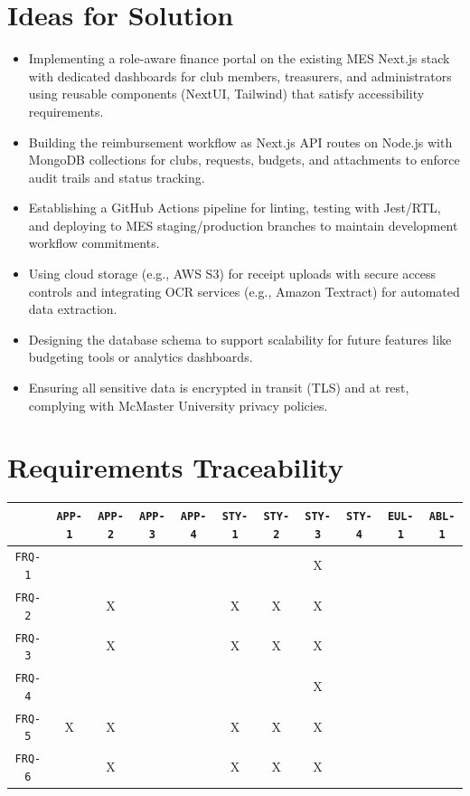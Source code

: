 \documentclass[12pt]{article}
\begin{document}
\section{Ideas for Solution}
  \begin{itemize}
    \item Implementing a role-aware finance portal on the existing MES Next.js stack with dedicated dashboards for club members, treasurers, and administrators using reusable components (NextUI, Tailwind) that satisfy accessibility requirements.
    \item Building the reimbursement workflow as Next.js API routes on Node.js with MongoDB collections for clubs, requests, budgets, and attachments to enforce audit trails and status tracking.
    \item Establishing a GitHub Actions pipeline for linting, testing with Jest/RTL, and deploying to MES staging/production branches to maintain development workflow commitments.
    \item Using cloud storage (e.g., AWS S3) for receipt uploads with secure access controls and integrating OCR services (e.g., Amazon Textract) for automated data extraction.
    \item Designing the database schema to support scalability for future features like budgeting tools or analytics dashboards.
    \item Ensuring all sensitive data is encrypted in transit (TLS) and at rest, complying with McMaster University privacy policies.
  \end{itemize}

\section{Requirements Traceability}


\centering
\begin{tabular}{|c|c|c|c|c|c|c|c|c|c|c|}
\hline
	& \texttt{APP-1} & \texttt{APP-2} & \texttt{APP-3} & \texttt{APP-4} & \texttt{STY-1} & \texttt{STY-2} & \texttt{STY-3} & \texttt{STY-4} & \texttt{EUL-1} & \texttt{ABL-1} \\
\hline
\texttt{FRQ-1} &  &  &  &  &  &  & X &  &  &  \\ \hline
\texttt{FRQ-2} &  & X &  &  & X & X & X &  &  &  \\ \hline
\texttt{FRQ-3} &  & X &  &  & X & X & X &  &  &  \\ \hline
\texttt{FRQ-4} &  &  &  &  &  &  & X &  &  &  \\ \hline
\texttt{FRQ-5} & X & X &  &  & X & X & X &  &  &  \\ \hline
\texttt{FRQ-6} &  & X &  &  & X & X & X &  &  &  \\ \hline
\end{tabular}
\end{document}

